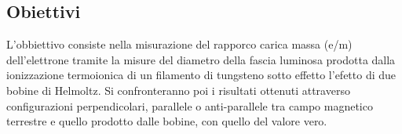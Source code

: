 \subsection{Obiettivi}
L'obbiettivo consiste nella misurazione del rapporco carica massa (e/m) dell'elettrone tramite la misure del diametro della fascia luminosa prodotta dalla ionizzazione termoionica di un filamento di tungsteno sotto effetto l'efetto di due bobine di Helmoltz.
Si confronteranno poi i risultati ottenuti attraverso configurazioni perpendicolari, parallele o anti-parallele tra campo magnetico terrestre e quello prodotto dalle bobine, con quello del valore vero.
